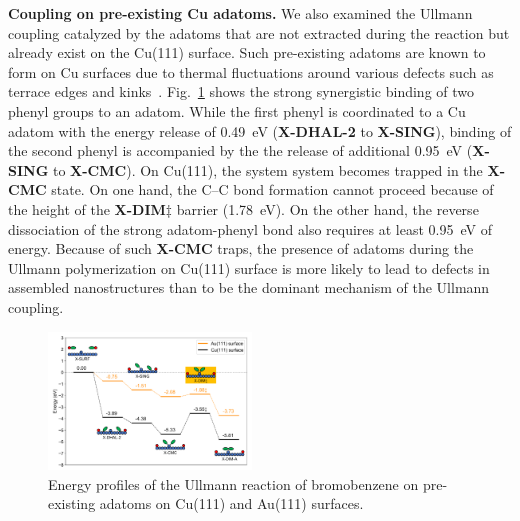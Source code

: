 \documentclass[aps,prb,amsmath,amssymb,11pt]{revtex4-1}
\newcommand{\zhzh}{\color{black}}
\renewcommand{\sout}[1]{\unskip}
\begin{document}
\textbf{Coupling on {\zhzh pre-}existing Cu adatoms.} We also examined the Ullmann coupling catalyzed by the adatoms that are not extracted during the reaction but already exist on the Cu(111) surface. Such pre-existing adatoms are known to form on Cu surfaces due to thermal fluctuations around various defects such as terrace edges and kinks~\cite{giesen2001step}.
\sout{Fig.~\ref{fig:adatomullmann} shows that the Ullmann coupling of surface-bound phenyl groups on a pre-exisitng adatom is a highly exothermic process. Once the carbon-halogen bond is broken (e.g. on the ideal surface) the phenyl groups need to overcome only a minor diffusion barrier~\cite{pccp2010} to move closer to the existing adatom and to form bonds with them.}
Fig.~\ref{fig:adatomullmann} shows the {\zhzh strong} synergistic binding of two phenyl groups to an adatom. While the first phenyl is coordinated to \sout{the} {\zhzh a Cu} adatom with the energy release of \SI{0.49}{\electronvolt} {\zhzh (\textbf{X-DHAL-2} to \textbf{X-SING})}, binding of the second phenyl is accompanied by the the release of additional \SI{0.95}{\electronvolt} {\zhzh (\textbf{X-SING} to \textbf{X-CMC}). On Cu(111),} \sout{and} the system system becomes trapped in the \textbf{X-CMC} state. On one hand, the C--C bond formation cannot proceed because of the height of the \textbf{X-DIM$\ddagger$} barrier {\zhzh (\SI{1.78}{\electronvolt})}. On the other hand, the reverse dissociation of the strong adatom-phenyl bond also requires at least \SI{0.95}{\electronvolt} of energy. 
Because of such \textbf{X-CMC} traps, the presence of adatoms during the Ullmann polymerization on Cu(111) surface \sout{can lead to defects in the assembled nanostructures.} {\zhzh is more likely to lead to defects in assembled nanostructures than to be the dominant mechanism of the Ullmann coupling.}

\begin{figure}[bt]
\centering
\includegraphics[width=0.48\textwidth]{Fig/ullmann_adatom.pdf}
\caption{Energy profiles of the Ullmann reaction of bromobenzene on pre-existing adatoms on Cu(111) and Au(111) surfaces.}
\label{fig:adatomullmann}
\end{figure}
\end{document}

